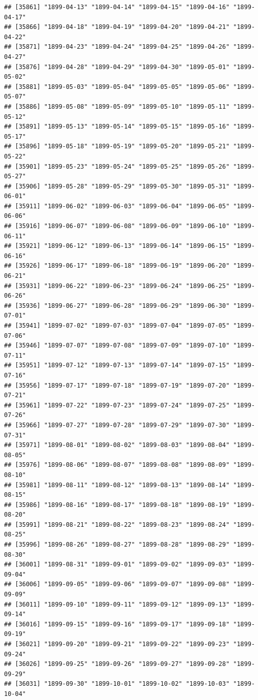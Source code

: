 \documentclass{article}\usepackage[]{graphicx}\usepackage[]{color}
\makeatletter
\newenvironment{kframe}{%
 \def\at@end@of@kframe{}%
 \ifinner\ifhmode%
  \def\at@end@of@kframe{\end{minipage}}%
  \begin{minipage}{\columnwidth}%
 \fi\fi%
 \def\FrameCommand##1{\hskip\@totalleftmargin \hskip-\fboxsep
 \colorbox{shadecolor}{##1}\hskip-\fboxsep
     \hskip-\linewidth \hskip-\@totalleftmargin \hskip\columnwidth}%
 \MakeFramed {\advance\hsize-\width
   \@totalleftmargin\z@ \linewidth\hsize
   \@setminipage}}%
 {\par\unskip\endMakeFramed%
 \at@end@of@kframe}
\newenvironment{knitrout}{}{} %
\makeatother
\begin{document}
\begin{description}
\begin{knitrout}
\begin{kframe}
\begin{verbatim}
## [35861] "1899-04-13" "1899-04-14" "1899-04-15" "1899-04-16" "1899-04-17"
## [35866] "1899-04-18" "1899-04-19" "1899-04-20" "1899-04-21" "1899-04-22"
## [35871] "1899-04-23" "1899-04-24" "1899-04-25" "1899-04-26" "1899-04-27"
## [35876] "1899-04-28" "1899-04-29" "1899-04-30" "1899-05-01" "1899-05-02"
## [35881] "1899-05-03" "1899-05-04" "1899-05-05" "1899-05-06" "1899-05-07"
## [35886] "1899-05-08" "1899-05-09" "1899-05-10" "1899-05-11" "1899-05-12"
## [35891] "1899-05-13" "1899-05-14" "1899-05-15" "1899-05-16" "1899-05-17"
## [35896] "1899-05-18" "1899-05-19" "1899-05-20" "1899-05-21" "1899-05-22"
## [35901] "1899-05-23" "1899-05-24" "1899-05-25" "1899-05-26" "1899-05-27"
## [35906] "1899-05-28" "1899-05-29" "1899-05-30" "1899-05-31" "1899-06-01"
## [35911] "1899-06-02" "1899-06-03" "1899-06-04" "1899-06-05" "1899-06-06"
## [35916] "1899-06-07" "1899-06-08" "1899-06-09" "1899-06-10" "1899-06-11"
## [35921] "1899-06-12" "1899-06-13" "1899-06-14" "1899-06-15" "1899-06-16"
## [35926] "1899-06-17" "1899-06-18" "1899-06-19" "1899-06-20" "1899-06-21"
## [35931] "1899-06-22" "1899-06-23" "1899-06-24" "1899-06-25" "1899-06-26"
## [35936] "1899-06-27" "1899-06-28" "1899-06-29" "1899-06-30" "1899-07-01"
## [35941] "1899-07-02" "1899-07-03" "1899-07-04" "1899-07-05" "1899-07-06"
## [35946] "1899-07-07" "1899-07-08" "1899-07-09" "1899-07-10" "1899-07-11"
## [35951] "1899-07-12" "1899-07-13" "1899-07-14" "1899-07-15" "1899-07-16"
## [35956] "1899-07-17" "1899-07-18" "1899-07-19" "1899-07-20" "1899-07-21"
## [35961] "1899-07-22" "1899-07-23" "1899-07-24" "1899-07-25" "1899-07-26"
## [35966] "1899-07-27" "1899-07-28" "1899-07-29" "1899-07-30" "1899-07-31"
## [35971] "1899-08-01" "1899-08-02" "1899-08-03" "1899-08-04" "1899-08-05"
## [35976] "1899-08-06" "1899-08-07" "1899-08-08" "1899-08-09" "1899-08-10"
## [35981] "1899-08-11" "1899-08-12" "1899-08-13" "1899-08-14" "1899-08-15"
## [35986] "1899-08-16" "1899-08-17" "1899-08-18" "1899-08-19" "1899-08-20"
## [35991] "1899-08-21" "1899-08-22" "1899-08-23" "1899-08-24" "1899-08-25"
## [35996] "1899-08-26" "1899-08-27" "1899-08-28" "1899-08-29" "1899-08-30"
## [36001] "1899-08-31" "1899-09-01" "1899-09-02" "1899-09-03" "1899-09-04"
## [36006] "1899-09-05" "1899-09-06" "1899-09-07" "1899-09-08" "1899-09-09"
## [36011] "1899-09-10" "1899-09-11" "1899-09-12" "1899-09-13" "1899-09-14"
## [36016] "1899-09-15" "1899-09-16" "1899-09-17" "1899-09-18" "1899-09-19"
## [36021] "1899-09-20" "1899-09-21" "1899-09-22" "1899-09-23" "1899-09-24"
## [36026] "1899-09-25" "1899-09-26" "1899-09-27" "1899-09-28" "1899-09-29"
## [36031] "1899-09-30" "1899-10-01" "1899-10-02" "1899-10-03" "1899-10-04"

\end{verbatim}
\end{kframe}
\end{knitrout}
\end{description}
\end{document}
